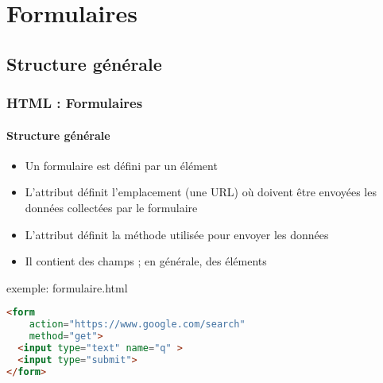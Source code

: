 \documentclass[xcolor=table]{beamer}
\begin{document}
\section{Formulaires}

%
%

\subsection{Structure générale}

\begin{frame}[fragile]
\frametitle{HTML : Formulaires}
\framesubtitle{Structure générale}

\begin{minipage}{0.44\textwidth} 
	\begin{itemize}
		\item Un formulaire est défini par un élément 
		\item L'attribut  définit l'emplacement (une URL) où doivent être envoyées les données collectées par le formulaire
		\item L'attribut  définit la méthode  utilisée pour envoyer les données
		\item Il contient des champs ; en générale, des éléments 
	\end{itemize}
\end{minipage}
%
\begin{minipage}{0.55\textwidth}
\begin{exampleblock}{exemple: formulaire.html}
\lstset{escapeinside=**}
\scriptsize\bfseries\vspace{-6pt}
\begin{lstlisting}[language={html}]
<form 
    action="https://www.google.com/search" 
    method="get">
  <input type="text" name="q" >
  <input type="submit">
</form>
\end{lstlisting}\vspace{-6pt}
\end{exampleblock}
\end{minipage}

\end{frame}
\end{document}
